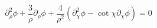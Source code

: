 \begin{equation}
\partial_{\rho}^2 \phi + \frac{3}{\rho} \partial_\rho \phi + \frac{4}
 {\rho^2} \left( \partial_\chi^2 \phi - \cot{\chi} \partial_\chi \phi \right) = 0
\end{equation}

